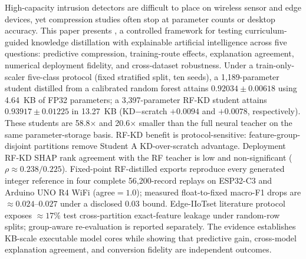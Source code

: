 High-capacity intrusion detectors are difficult to place on wireless sensor and edge devices, yet compression studies often stop at parameter counts or desktop accuracy. This paper presents \method{}, a controlled framework for testing curriculum-guided knowledge distillation with explainable artificial intelligence across five questions: predictive compression, training-route effects, explanation agreement, numerical deployment fidelity, and cross-dataset robustness. Under a train-only-scaler five-class \dataset{} protocol (fixed stratified split, ten seeds), a 1,189-parameter student distilled from a calibrated random forest attains $0.92034\pm0.00618$ \mf{} using 4.64~KB of FP32 parameters; a 3,397-parameter RF-KD student attains $0.93917\pm0.01225$ in 13.27~KB (KD$-$scratch $+0.0094$ and $+0.0078$, respectively). These students are 58.8$\times$ and 20.6$\times$ smaller than the full neural teacher on the same parameter-storage basis. RF-KD benefit is protocol-sensitive: feature-group-disjoint partitions remove Student A KD-over-scratch advantage. Deployment RF-KD SHAP rank agreement with the RF teacher is low and non-significant ($\rho\approx0.238/0.225$). Fixed-point RF-distilled exports reproduce every generated integer reference in four complete 56,200-record replays on ESP32-C3 and Arduino UNO R4 WiFi (agree$=1.0$); measured float-to-fixed macro-F1 drops are $\approx0.024$--$0.027$ under a disclosed 0.03 bound. Edge-IIoTset literature protocol exposes $\approx17\%$ test cross-partition exact-feature leakage under random-row splits; group-aware re-evaluation is reported separately. The evidence establishes KB-scale executable model cores while showing that predictive gain, cross-model explanation agreement, and conversion fidelity are independent outcomes.

